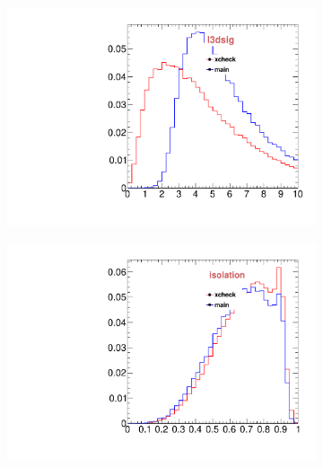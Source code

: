 \begin{figure}
\begin{subfigure}[b]{0.2\textwidth}
                \includegraphics[width=\textwidth]{Figures/VariablesComparison/Data_endcaps_figs/fls3d}
                \label{fig:Data_endcaps_fls3d}
        \end{subfigure}
        \begin{subfigure}[b]{0.2\textwidth}
                \centering
                \includegraphics[width=\textwidth]{Figures/VariablesComparison/Data_endcaps_figs/iso}
                \label{fig:Data_endcaps_iso}
        \end{subfigure}
        \begin{subfigure}[b]{0.2\textwidth}
                \centering

\end{subfigure}
\end{figure}
